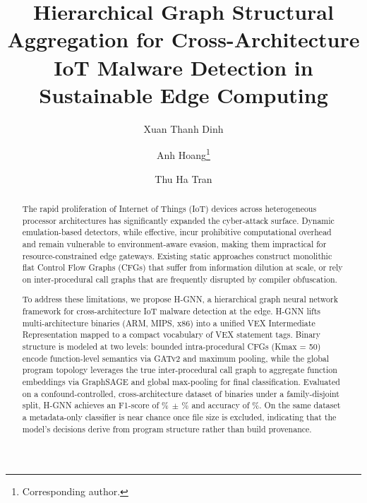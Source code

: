 \documentclass{llncs}
\begin{document}
\title{Hierarchical Graph Structural Aggregation for Cross-Architecture IoT Malware Detection in Sustainable Edge Computing}

\author{Xuan Thanh Dinh \and
Anh Hoang\thanks{Corresponding author.} \and
Thu Ha Tran}



\maketitle

\begin{abstract}
The rapid proliferation of Internet of Things (IoT) devices across
heterogeneous processor architectures has significantly expanded
the cyber-attack surface. Dynamic emulation-based detectors, while
effective, incur prohibitive computational overhead and remain
vulnerable to environment-aware evasion, making them impractical
for resource-constrained edge gateways. Existing static approaches
construct monolithic flat Control Flow Graphs (CFGs) that suffer
from information dilution at scale, or rely on inter-procedural
call graphs that are frequently disrupted by compiler obfuscation.

To address these limitations, we propose H-GNN, a hierarchical
graph neural network framework for cross-architecture IoT malware
detection at the edge. H-GNN lifts multi-architecture binaries
(ARM, MIPS, x86) into a unified VEX Intermediate Representation
mapped to a compact vocabulary of VEX statement tags. Binary structure is modeled
at two levels: bounded intra-procedural CFGs (Kmax = 50) encode
function-level semantics via GATv2 and maximum pooling, while the 
global program topology leverages the true inter-procedural call graph 
to aggregate function embeddings via GraphSAGE and global max-pooling 
for final classification.
Evaluated on a confound-controlled, cross-architecture dataset of
\hgnnNumSamples binaries under a family-disjoint split, H-GNN achieves an
F1-score of \hgnnF\%$\,\pm\,$\hgnnFstd\% and accuracy of \hgnnAcc\%.
On the same dataset a metadata-only classifier is near chance once file size
is excluded, indicating that the model's decisions derive from program
structure rather than build provenance.
\end{abstract}
\end{document}
